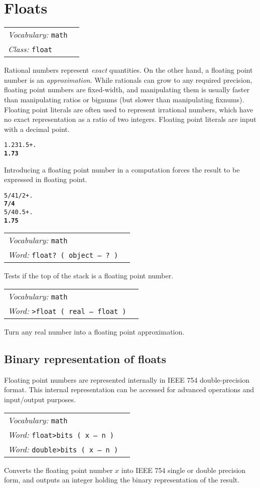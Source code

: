 \documentclass{book}
\newcommand{\vocabulary}[1]{\emph{Vocabulary:} \texttt{#1}&\\}
\newcommand{\ordinaryword}[2]{\index{\texttt{#1}}\emph{Word:} \texttt{#2}&\\}
\newcommand{\classword}[1]{\index{\texttt{#1}}\emph{Class:} \texttt{#1}&\\}
\newcommand{\predword}[1]{\ordinaryword{#1}{#1~( object -- ?~)}}
\newcommand{\wordtable}[1]{


\begin{tabularx}{12cm}{lX}
\hline
#1
\hline
\end{tabularx}

}
\begin{document}
\section{Floats}\label{floats}

\wordtable{
\vocabulary{math}
\classword{float}
}
\newcommand{\realglos}{}
\realglos
\floatglos

Rational numbers represent \emph{exact} quantities. On the other hand, a floating point number is an \emph{approximation}. While rationals can grow to any required precision, floating point numbers are fixed-width, and manipulating them is usually faster than manipulating ratios or bignums (but slower than manipulating fixnums). Floating point literals are often used to represent irrational numbers, which have no exact representation as a ratio of two integers. Floating point literals are input with a decimal point.

\begin{alltt}
  1.23 1.5 + .
\textbf{1.73}
\end{alltt}

Introducing a floating point number in a computation forces the result to be expressed in floating point.

\begin{alltt}
  5/4 1/2 + .
\textbf{7/4}
  5/4 0.5 + .
\textbf{1.75}
\end{alltt}

\wordtable{
\vocabulary{math}
\predword{float?}
}
Tests if the top of the stack is a floating point number.
\wordtable{
\vocabulary{math}
\ordinaryword{>float}{>float ( real -- float )}
}
Turn any real number into a floating point approximation.

\subsection{Binary representation of floats}\label{float-bits}

Floating point numbers are represented internally in IEEE 754 double-precision format. This internal representation can be accessed for advanced operations and input/output purposes.

\wordtable{
\vocabulary{math}
\ordinaryword{float>bits}{float>bits ( x -- n )}
\ordinaryword{double>bits}{double>bits ( x -- n )}
}
Converts the floating point number $x$ into IEEE 754 single or double precision form, and outputs an integer holding the binary representation of the result.
\end{document}
